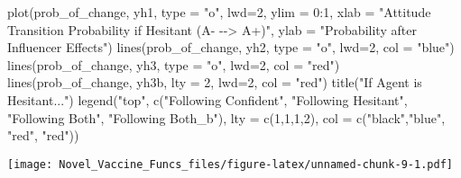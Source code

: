 \documentclass[
]{article}
\newenvironment{Shaded}{\begin{snugshade}}{\end{snugshade}}
\newcommand{\AttributeTok}[1]{\textcolor[rgb]{0.77,0.63,0.00}{#1}}
\newcommand{\DecValTok}[1]{\textcolor[rgb]{0.00,0.00,0.81}{#1}}
\newcommand{\FunctionTok}[1]{\textcolor[rgb]{0.00,0.00,0.00}{#1}}
\newcommand{\NormalTok}[1]{#1}
\newcommand{\SpecialCharTok}[1]{\textcolor[rgb]{0.00,0.00,0.00}{#1}}
\newcommand{\StringTok}[1]{\textcolor[rgb]{0.31,0.60,0.02}{#1}}
\begin{document}
\begin{Shaded}
\begin{Highlighting}[]
\FunctionTok{plot}\NormalTok{(prob\_of\_change, yh1, }\AttributeTok{type =} \StringTok{"o"}\NormalTok{, }\AttributeTok{lwd=}\DecValTok{2}\NormalTok{, }\AttributeTok{ylim =} \DecValTok{0}\SpecialCharTok{:}\DecValTok{1}\NormalTok{, }\AttributeTok{xlab =} \StringTok{"Attitude Transition Probability if Hesitant (A{-} {-}{-}\textgreater{} A+)"}\NormalTok{, }\AttributeTok{ylab =} \StringTok{"Probability after Influencer Effects"}\NormalTok{)}
\FunctionTok{lines}\NormalTok{(prob\_of\_change, yh2, }\AttributeTok{type =} \StringTok{"o"}\NormalTok{, }\AttributeTok{lwd=}\DecValTok{2}\NormalTok{, }\AttributeTok{col =} \StringTok{"blue"}\NormalTok{)}
\FunctionTok{lines}\NormalTok{(prob\_of\_change, yh3, }\AttributeTok{type =} \StringTok{"o"}\NormalTok{, }\AttributeTok{lwd=}\DecValTok{2}\NormalTok{, }\AttributeTok{col =} \StringTok{"red"}\NormalTok{)}
\FunctionTok{lines}\NormalTok{(prob\_of\_change, yh3b, }\AttributeTok{lty =} \DecValTok{2}\NormalTok{, }\AttributeTok{lwd=}\DecValTok{2}\NormalTok{, }\AttributeTok{col =} \StringTok{"red"}\NormalTok{)}
\FunctionTok{title}\NormalTok{(}\StringTok{"If Agent is Hesitant..."}\NormalTok{)}
\FunctionTok{legend}\NormalTok{(}\StringTok{"top"}\NormalTok{, }\FunctionTok{c}\NormalTok{(}\StringTok{"Following Confident"}\NormalTok{, }\StringTok{"Following Hesitant"}\NormalTok{, }\StringTok{"Following Both"}\NormalTok{, }\StringTok{"Following Both\_b"}\NormalTok{), }\AttributeTok{lty =} \FunctionTok{c}\NormalTok{(}\DecValTok{1}\NormalTok{,}\DecValTok{1}\NormalTok{,}\DecValTok{1}\NormalTok{,}\DecValTok{2}\NormalTok{), }\AttributeTok{col =} \FunctionTok{c}\NormalTok{(}\StringTok{"black"}\NormalTok{,}\StringTok{"blue"}\NormalTok{, }\StringTok{"red"}\NormalTok{, }\StringTok{"red"}\NormalTok{))}
\end{Highlighting}
\end{Shaded}

\texttt{[image: Novel\_Vaccine\_Funcs\_files/figure-latex/unnamed-chunk-9-1.pdf]}
\end{document}
